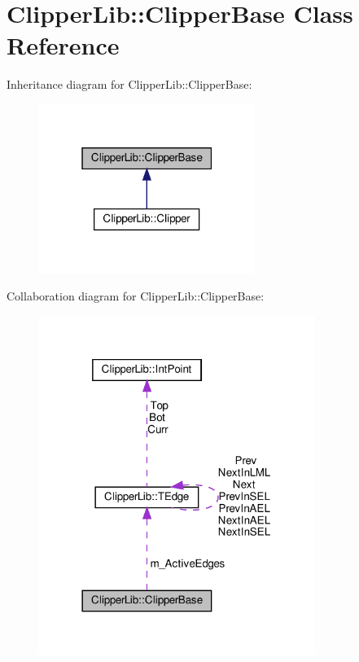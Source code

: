 \hypertarget{class_clipper_lib_1_1_clipper_base}{}\section{Clipper\+Lib\+:\+:Clipper\+Base Class Reference}
\label{class_clipper_lib_1_1_clipper_base}


Inheritance diagram for Clipper\+Lib\+:\+:Clipper\+Base\+:
\nopagebreak
\begin{figure}[H]
\begin{center}
\leavevmode
\includegraphics[width=199pt]{class_clipper_lib_1_1_clipper_base__inherit__graph}
\end{center}
\end{figure}


Collaboration diagram for Clipper\+Lib\+:\+:Clipper\+Base\+:
\nopagebreak
\begin{figure}[H]
\begin{center}
\leavevmode
\includegraphics[width=254pt]{class_clipper_lib_1_1_clipper_base__coll__graph}
\end{center}
\end{figure}
